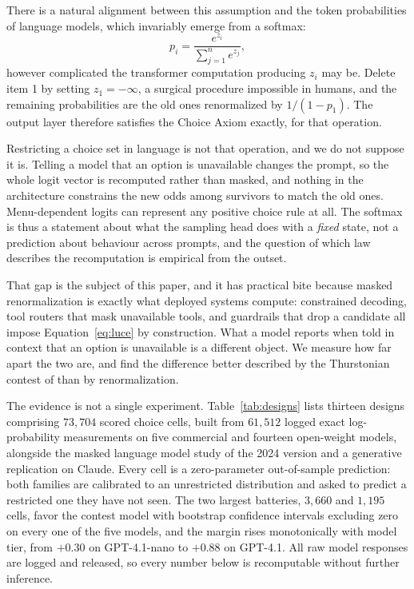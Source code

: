 \documentclass[11pt]{article}
\begin{document}
There is a natural alignment between this assumption and the token
probabilities of language models, which invariably emerge from a softmax:
\begin{equation}
p_i = \frac{e^{z_i}}{\sum_{j=1}^n e^{z_j}},
\label{eq:softmax}
\end{equation}
however complicated the transformer computation producing $z_i$ may be.
Delete item 1 by setting $z_1 = -\infty$, a surgical procedure impossible in
humans, and the remaining probabilities are the old ones renormalized by
$1/(1-p_1)$. The output layer therefore satisfies the Choice Axiom exactly,
for that operation.

Restricting a choice set in language is not that operation, and we do not
suppose it is. Telling a model that an option is unavailable changes the
prompt, so the whole logit vector is recomputed rather than masked, and
nothing in the architecture constrains the new odds among survivors to match
the old ones. Menu-dependent logits can represent any positive choice rule at
all. The softmax is thus a statement about what the sampling head does with a
\emph{fixed} state, not a prediction about behaviour across prompts, and the
question of which law describes the recomputation is empirical from the
outset.

That gap is the subject of this paper, and it has practical bite because
masked renormalization is exactly what deployed systems compute: constrained
decoding, tool routers that mask unavailable tools, and guardrails that drop
a candidate all impose Equation~\eqref{eq:luce} by construction. What a model
reports when told in context that an option is unavailable is a different
object. We measure how far apart the two are, and find the difference better
described by the Thurstonian contest of \cite{thurstone1927} than by
renormalization.

The evidence is not a single experiment. Table~\ref{tab:designs} lists
thirteen designs comprising $73{,}704$ scored choice cells, built from
$61{,}512$ logged exact log-probability measurements on five commercial and
fourteen open-weight models, alongside the masked language model study of the 2024 version and a
generative replication on Claude. Every cell is a zero-parameter
out-of-sample prediction: both families are calibrated to an unrestricted
distribution and asked to predict a restricted one they have not seen. The
two largest batteries, $3{,}660$ and $1{,}195$ cells, favor the contest
model with bootstrap confidence intervals excluding zero on every one of
the five models, and the margin rises monotonically with model tier, from
$+0.30$ on GPT-4.1-nano to $+0.88$ on GPT-4.1. All raw model responses are
logged and released, so every number below is recomputable without further
inference.
\end{document}
